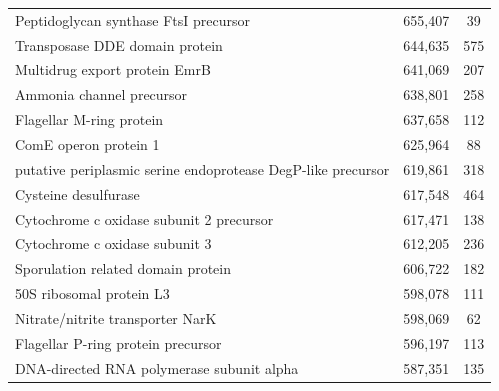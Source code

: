 \begin{singlespace}
\begin{longtable}{p{} cc}
                                                     Peptidoglycan synthase FtsI precursor &                     655,407 &            39 \\
                                                            Transposase DDE domain protein &                     644,635 &           575 \\
                                                             Multidrug export protein EmrB &                     641,069 &           207 \\
                                                                 Ammonia channel precursor &                     638,801 &           258 \\
                                                                  Flagellar M-ring protein &                     637,658 &           112 \\
                                                                     ComE operon protein 1 &                     625,964 &            88 \\
                              putative periplasmic serine endoprotease DegP-like precursor &                     619,861 &           318 \\
                                                                      Cysteine desulfurase &                     617,548 &           464 \\
                                                  Cytochrome c oxidase subunit 2 precursor &                     617,471 &           138 \\
                                                            Cytochrome c oxidase subunit 3 &                     612,205 &           236 \\
                                                        Sporulation related domain protein &                     606,722 &           182 \\
                                                                  50S ribosomal protein L3 &                     598,078 &           111 \\
                                                          Nitrate/nitrite transporter NarK &                     598,069 &            62 \\
                                                        Flagellar P-ring protein precursor &                     596,197 &           113 \\
                                                 DNA-directed RNA polymerase subunit alpha &                     587,351 &           135 \\

\end{longtable}
\end{singlespace}
